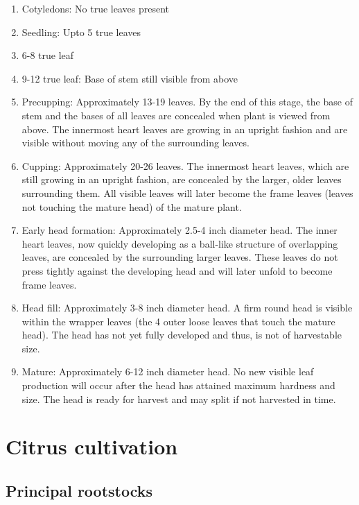 \documentclass[
]{book}
\providecommand{\tightlist}{%
  \setlength{\itemsep}{0pt}\setlength{\parskip}{0pt}}
\begin{document}
\begin{enumerate}
\def\labelenumi{\arabic{enumi}.}
\tightlist
\item
  Cotyledons: No true leaves present
\item
  Seedling: Upto 5 true leaves
\item
  6-8 true leaf
\item
  9-12 true leaf: Base of stem still visible from above
\item
  Precupping: Approximately 13-19 leaves. By the end of this stage, the base of stem and the bases of all leaves are concealed when plant is viewed from above. The innermost heart leaves are growing in an upright fashion and are visible without moving any of the surrounding leaves.
\item
  Cupping: Approximately 20-26 leaves. The innermost heart leaves, which are still growing in an upright fashion, are concealed by the larger, older leaves surrounding them. All visible leaves will later become the frame leaves (leaves not touching the mature head) of the mature plant.
\item
  Early head formation: Approximately 2.5-4 inch diameter head. The inner heart leaves, now quickly developing as a ball-like structure of overlapping leaves, are concealed by the surrounding larger leaves. These leaves do not press tightly against the developing head and will later unfold to become frame leaves.
\item
  Head fill: Approximately 3-8 inch diameter head. A firm round head is visible within the wrapper leaves (the 4 outer loose leaves that touch the mature head). The head has not yet fully developed and thus, is not of harvestable size.
\item
  Mature: Approximately 6-12 inch diameter head. No new visible leaf production will occur after the head has attained maximum hardness and size. The head is ready for harvest and may split if not harvested in time.
\end{enumerate}

\hypertarget{citrus-cultivation}{%
\section{Citrus cultivation}\label{citrus-cultivation}}

\hypertarget{principal-rootstocks}{%
\subsection{Principal rootstocks}\label{principal-rootstocks}}
\end{document}
